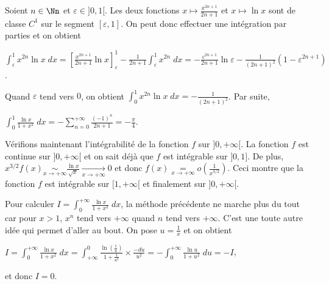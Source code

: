 {{Soient $n\in\Nn$ et $\varepsilon\in]0,1[$. Les deux fonctions $x\mapsto\frac{x^{2n+1}}{2n+1}$ et $x\mapsto\ln x$ sont de classe $C^1$ sur le segment $[\varepsilon,1]$. On peut donc effectuer une intégration par parties et on obtient

\begin{center}
$\int_{\varepsilon}^{1}x^{2n}\ln x\;dx=\left[\frac{x^{2n+1}}{2n+1}\ln x\right]_\varepsilon^1-\frac{1}{2n+1}\int_{\varepsilon}^{1}x^{2n}\;dx=-\frac{\varepsilon^{2n+1}}{2n+1}\ln \varepsilon-\frac{1}{(2n+1)^2}(1-\varepsilon^{2n+1})$.
\end{center}

Quand $\varepsilon$ tend vers $0$, on obtient $\int_{0}^{1}x^{2n}\ln x\;dx=-\frac{1}{(2n+1)^2}$. Par suite,

\begin{center}
$\int_{0}^{1}\frac{\ln x}{1+x^2}\;dx=-\sum_{n=0}^{+\infty}\frac{(-1)^n}{2n+1}=-\frac{\pi}{4}$.
\end{center}

Vérifions maintenant l'intégrabilité de la fonction $f$ sur $]0,+\infty[$. La fonction $f$ est continue sur $]0,+\infty[$ et on sait déjà que $f$ est intégrable sur $]0,1]$. De plus, $x^{3/2}f(x)\underset{x\rightarrow+\infty}{\sim}\frac{\ln x}{\sqrt{x}}\underset{x\rightarrow+\infty}{\rightarrow}0$ et donc $f(x)\underset{x\rightarrow+\infty}{=}o\left(\frac{1}{x^{3/2}}\right)$. Ceci montre que la fonction $f$ est intégrable sur $[1,+\infty[$ et finalement sur $]0,+\infty[$.

Pour calculer $I=\int_{0}^{+\infty}\frac{\ln x}{1+x^2}\;dx$, la méthode précédente ne marche plus du tout  car pour $x>1$, $x^{n}$ tend vers $+\infty$ quand $n$ tend vers $+\infty$. C'est une toute autre idée qui permet d'aller au bout. On pose $u=\frac{1}{x}$ et on obtient

\begin{center}
$I=\int_{0}^{+\infty}\frac{\ln x}{1+x^2}\;dx=\int_{+\infty}^{0}\frac{\ln\left(\frac{1}{u}\right)}{1+\frac{1}{u^2}}\times\frac{-du}{u^2}=-\int_{0}^{+\infty}\frac{\ln u}{1+u^2}\;du=-I$,
\end{center}

et donc $I=0$.

\begin{center}
\end{center}
}
}

